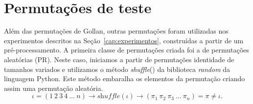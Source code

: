 



 \section{Permutações de teste}

 Além das permutações de Gollan, outras permutações foram utilizadas nos experimentos descritos na Seção~\ref{cap:experimentos}, construídas a partir de um pré-processamento. A primeira classe de permutações criada foi a de permutações aleatórias (PR). Neste caso, iniciamos a partir de permutações identidade de tamanhos variados e utilizamos o método \textit{shuffle}() da biblioteca \textit{random} da linguagem Python. Este método embaralha os elementos da permutação criando assim uma permutação aleatória.  
  \[ \iota = (1 \ 2 \ 3 \ 4  \ \ldots \ n) \rightarrow \textit{shuffle}(\iota) \rightarrow (\pi_1 \ \pi_2 \ \pi_3 \ \ldots \ \pi_n)=\pi \neq \iota.\]
 

